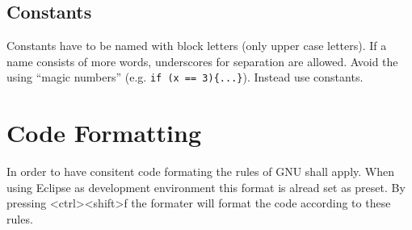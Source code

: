 \documentclass[final,a4paper,10pt, oneside]{article}
\begin{document}
\subsection{Constants}
Constants have to be named with block letters (only upper case letters). If a name consists of more words, underscores for separation are
allowed.  Avoid the using ``magic numbers'' 
(e.g. \verb|if (x == 3){...}|). Instead use constants.


\section{Code Formatting}
In order to have consitent code formating the rules of GNU shall apply. When using Eclipse as development environment this format is alread set as preset. By pressing <ctrl><shift>f the formater will format the code according to these rules.
\end{document}
